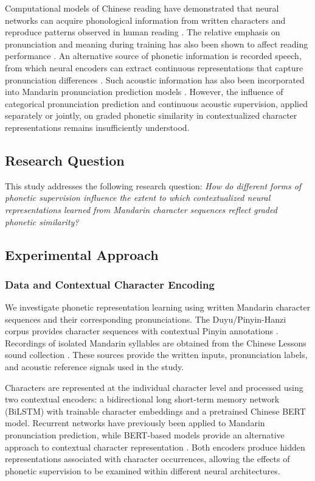 Computational models of Chinese reading have demonstrated that neural networks
can acquire phonological information from written characters and reproduce
patterns observed in human reading \cite{ref_yang2009}. The relative emphasis on
pronunciation and meaning during training has also been shown to affect reading
performance \cite{ref_kuo2025}. An alternative source of phonetic information is
recorded speech, from which neural encoders can extract continuous
representations that capture pronunciation differences \cite{ref_bartelds2022}.
Such acoustic information has also been incorporated into Mandarin pronunciation
prediction models \cite{ref_g2pa2024}. However, the influence of categorical
pronunciation prediction and continuous acoustic supervision, applied separately
or jointly, on graded phonetic similarity in contextualized character
representations remains insufficiently understood.

\subsection{Research Question}
\label{sec:intro-question}

This study addresses the following research question: \emph{How do different forms of phonetic supervision influence the
extent to which contextualized neural representations learned from Mandarin
character sequences reflect graded phonetic similarity?}


\subsection{Experimental Approach}
\label{sec:intro-approach}

\subsubsection{Data and Contextual Character Encoding}
\label{sec:intro-data-encoding}

We investigate phonetic representation learning using written Mandarin character
sequences and their corresponding pronunciations. The Duyu/Pinyin-Hanzi corpus
provides character sequences with contextual Pinyin annotations \cite{ref_duyu}.
Recordings of isolated Mandarin syllables are obtained from the Chinese Lessons
sound collection \cite{ref_chinese_lessons}. These sources provide the written
inputs, pronunciation labels, and acoustic reference signals used in the study.

Characters are represented at the individual character level and processed using
two contextual encoders: a bidirectional long short-term memory network (BiLSTM)
with trainable character embeddings and a pretrained Chinese BERT model.
Recurrent networks have previously been applied to Mandarin pronunciation
prediction, while BERT-based models provide an alternative approach to
contextual character representation
\cite{ref_g2pm2020,ref_bert2019,ref_g2pw2022}. Both encoders produce hidden
representations associated with character occurrences, allowing the effects of
phonetic supervision to be examined within different neural architectures.

